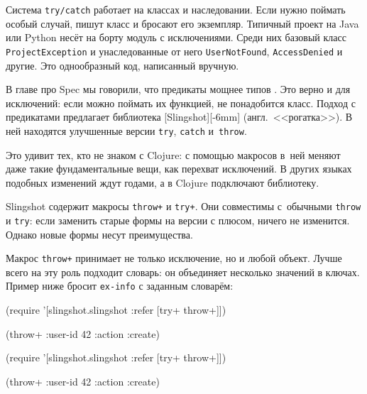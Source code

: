 
Система \verb|try/catch| работает на классах и наследовании. Если нужно
поймать особый случай, пишут класс и бросают его экземпляр. Типичный проект на
Java или Python несёт на борту модуль с исключениями. Среди них базовый класс
\verb|ProjectException| и унаследованные от него \verb|UserNotFound|,
\verb|AccessDenied| и другие. Это однообразный код, написанный вручную.


В главе про Spec мы говорили, что предикаты мощнее типов
. Это верно и для исключений: если можно поймать их
функцией, не понадобится класс. Подход с предикатами предлагает библиотека
[Slingshot][-6mm] (англ.~<<рогатка>>).
В ней находятся улучшенные версии \verb|try|, \verb|catch| и~\verb|throw|.


Это удивит тех, кто не знаком с Clojure: с помощью макросов в~ней меняют даже
такие фундаментальные вещи, как перехват исключений. В других языках подобных
изменений ждут годами, а в Clojure подключают библиотеку.


Slingshot содержит макросы \verb|throw+| и \verb|try+|. Они совместимы
с~обычными \verb|throw| и \verb|try|: если заменить старые формы на версии с
плюсом, ничего не изменится. Однако новые формы несут преимущества.

Макрос \verb|throw+| принимает не только исключение, но и любой объект. Лучше
всего на эту роль подходит словарь: он объединяет несколько значений в
ключах. Пример ниже бросит \verb|ex-info| с заданным словарём:

\ifx\DEVICETYPE\MOBILE

\begin{english}
  \begin{clojure}
(require
  '[slingshot.slingshot
    :refer [try+ throw+]])

(throw+ {:user-id 42 :action :create})
  \end{clojure}
\end{english}

\else

\begin{english}
  \begin{clojure}
(require '[slingshot.slingshot :refer [try+ throw+]])

(throw+ {:user-id 42 :action :create})
  \end{clojure}
\end{english}

